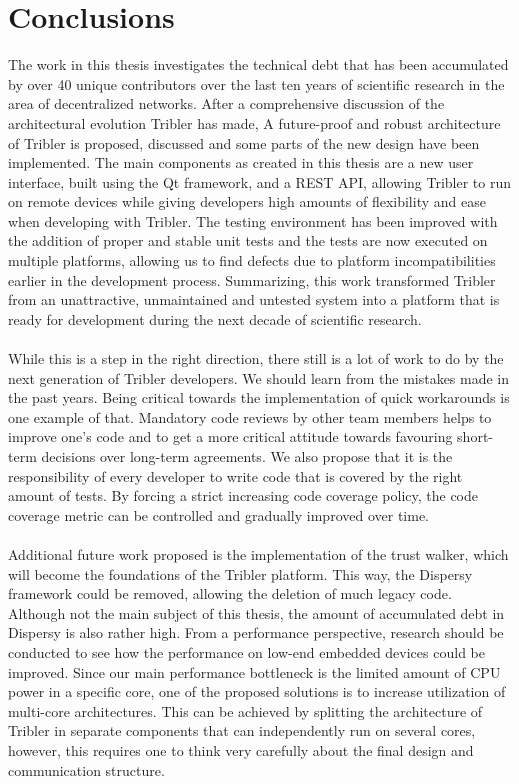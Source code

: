 \chapter{Conclusions}
\label{chapter:conclusions}

The work in this thesis investigates the technical debt that has been accumulated by over 40 unique contributors over the last ten years of scientific research in the area of decentralized networks. After a comprehensive discussion of the architectural evolution Tribler has made, A future-proof and robust architecture of Tribler is proposed, discussed and some parts of the new design have been implemented. The main components as created in this thesis are a new user interface, built using the Qt framework, and a REST API, allowing Tribler to run on remote devices while giving developers high amounts of flexibility and ease when developing with Tribler. The testing environment has been improved with the addition of proper and stable unit tests and the tests are now executed on multiple platforms, allowing us to find defects due to platform incompatibilities earlier in the development process. Summarizing, this work transformed Tribler from an unattractive, unmaintained and untested system into a platform that is ready for development during the next decade of scientific research.\\\\
While this is a step in the right direction, there still is a lot of work to do by the next generation of Tribler developers. We should learn from the mistakes made in the past years. Being critical towards the implementation of quick workarounds is one example of that. Mandatory code reviews by other team members helps to improve one's code and to get a more critical attitude towards favouring short-term decisions over long-term agreements. We also propose that it is the responsibility of every developer to write code that is covered by the right amount of tests. By forcing a strict increasing code coverage policy, the code coverage metric can be controlled and gradually improved over time.\\\\
Additional future work proposed is the implementation of the trust walker, which will become the foundations of the Tribler platform. This way, the Dispersy framework could be removed, allowing the deletion of much legacy code. Although not the main subject of this thesis, the amount of accumulated debt in Dispersy is also rather high. From a performance perspective, research should be conducted to see how the performance on low-end embedded devices could be improved. Since our main performance bottleneck is the limited amount of CPU power in a specific core, one of the proposed solutions is to increase utilization of multi-core architectures. This can be achieved by splitting the architecture of Tribler in separate components that can independently run on several cores, however, this requires one to think very carefully about the final design and communication structure.